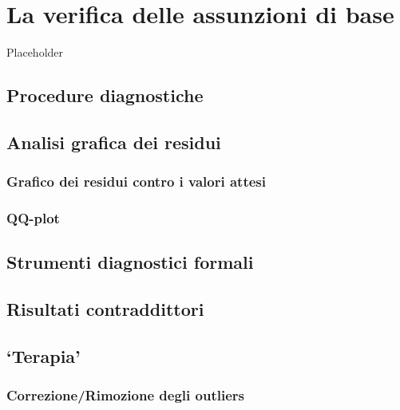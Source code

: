 \documentclass[a4paper,12pt,oneside]{book}
\begin{document}
\hypertarget{la-verifica-delle-assunzioni-di-base}{%
\chapter{La verifica delle assunzioni di base}\label{la-verifica-delle-assunzioni-di-base}}

Placeholder

\hypertarget{procedure-diagnostiche}{%
\section{Procedure diagnostiche}\label{procedure-diagnostiche}}

\hypertarget{analisi-grafica-dei-residui}{%
\section{Analisi grafica dei residui}\label{analisi-grafica-dei-residui}}

\hypertarget{grafico-dei-residui-contro-i-valori-attesi}{%
\subsection{Grafico dei residui contro i valori attesi}\label{grafico-dei-residui-contro-i-valori-attesi}}

\hypertarget{qq-plot}{%
\subsection{QQ-plot}\label{qq-plot}}

\hypertarget{strumenti-diagnostici-formali}{%
\section{Strumenti diagnostici formali}\label{strumenti-diagnostici-formali}}

\hypertarget{risultati-contraddittori}{%
\section{Risultati contraddittori}\label{risultati-contraddittori}}

\hypertarget{terapia}{%
\section{`Terapia'}\label{terapia}}

\hypertarget{correzionerimozione-degli-outliers}{%
\subsection{Correzione/Rimozione degli outliers}\label{correzionerimozione-degli-outliers}}
\end{document}
